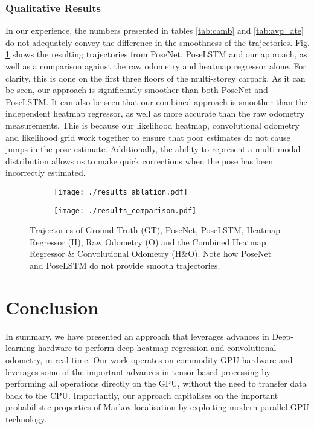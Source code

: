 \documentclass[letterpaper, 10 pt, conference]{ieeeconf}  %
\begin{document}
\subsubsection{Qualitative Results}
In our experience, the numbers presented in tables \ref{tab:camb} and \ref{tab:avp_ate} do not adequately convey the difference in the smoothness of the trajectories.
Fig. \ref{trajs} shows the resulting trajectories from PoseNet, PoseLSTM and our approach, as well as a comparison against the raw odometry and heatmap regressor alone.
For clarity, this is done on the first three floors of the multi-storey carpark.
As it can be seen, our approach is significantly smoother than both PoseNet and PoseLSTM.
It can also be seen that our combined approach is smoother than the independent heatmap regressor, as well as more accurate than the raw odometry measurements.
This is because our likelihood heatmap, convolutional odometry and likelihood grid work together to ensure that poor estimates do not cause jumps in the pose estimate.
Additionally, the ability to represent a multi-modal distribution allows us to make quick corrections when the pose has been incorrectly estimated. 
\begin{figure}
    \centering
    \begin{subfigure}[b]{0.49\linewidth}
        \centering
        \texttt{[image: ./results\_ablation.pdf]}
    \end{subfigure}
    \begin{subfigure}[b]{0.49\linewidth}
        \centering
        \texttt{[image: ./results\_comparison.pdf]}
    \end{subfigure}
    \caption{Trajectories of Ground Truth (GT), PoseNet, PoseLSTM,  Heatmap Regressor (H), Raw Odometry (O) and the Combined Heatmap Regressor \& Convolutional Odometry (H\&O). Note how PoseNet and PoseLSTM do not provide smooth trajectories.} 
    \label{trajs}
    \vspace{-0.55cm}
\end{figure}

\addtolength{\textheight}{-8.7cm}
\vspace{-0.125cm}
\section{Conclusion}
\vspace{-0.125cm}
In summary, we have presented an approach that leverages advances in Deep-learning hardware to perform deep heatmap regression and convolutional odometry, in real time.
Our work operates on commodity GPU hardware and leverages some of the important advances in tensor-based processing by performing all operations directly on the GPU, without the need to transfer data back to the CPU.
Importantly, our approach capitalises on the important probabilistic properties of Markov localisation by exploiting modern parallel GPU technology.


\end{document}
